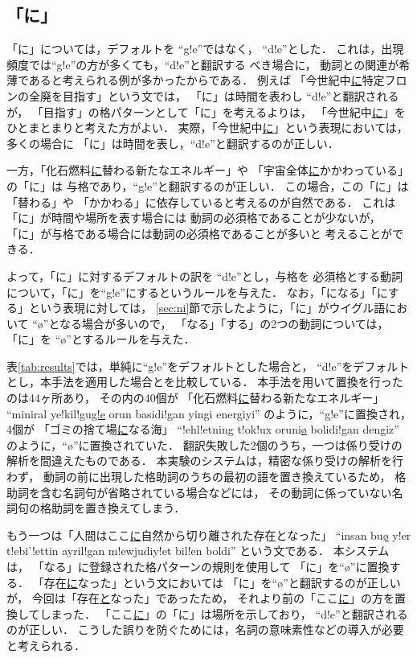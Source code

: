 \subsection{「に」}
\label{sec:ex_ni}
「に」については，デフォルトを ``g!e''ではなく，
``d!e''とした．
これは，出現頻度では``g!e''の方が多くても，``d!e''と翻訳する
べき場合に，
動詞との関連が希薄であると考えられる例が多かったからである．
例えば
「今世紀中\underline{に}特定フロンの全廃を目指す」という文では，
「に」は時間を表わし ``d!e''と翻訳されるが，
「目指す」の格パターンとして「に」を考えるよりは，
「今世紀中\underline{に}」をひとまとまりと考えた方がよい．
実際，「今世紀中\underline{に}」という表現においては，多くの場合に
「に」は時間を表し，``d!e''と翻訳するのが正しい．

一方，「化石燃料\underline{に}替わる新たなエネルギー」や
「宇宙全体\underline{に}かかわっている」の「に」は
与格であり，``g!e''と翻訳するのが正しい．
この場合，この「に」は「替わる」や
「かかわる」に依存していると考えるのが自然である．
これは「に」が時間や場所を表す場合には
動詞の必須格であることが少ないが，
「に」が与格である場合には動詞の必須格であることが多いと
考えることができる．

よって，「に」に対するデフォルトの訳を ``d!e''とし，与格を
必須格とする動詞について，「に」を``g!e''にするというルールを与えた．
なお，「になる」「にする」という表現に対しては，
\ref{sec:ni}節で示したように，「に」がウイグル語において
``\o''となる場合が多いので，
「なる」「する」の2つの動詞については，
「に」を ``\o''とするルールを与えた．

表\ref{tab:results}では，単純に``g!e''をデフォルトとした場合と，
``d!e''をデフォルトとし，本手法を適用した場合とを比較している．
本手法を用いて置換を行ったのは44ヶ所あり，
その内の40個が
「化石燃料\underline{に}替わる新たなエネルギー」 ``miniral
ye!kil!gu\underline{g!e} orun basidi!gan yingi energiyi''
のように，``g!e''に置換され，
4個が 
「ゴミの捨て場\underline{に}なる海」 ``!ehl!etning t!ok!ux oruni\underline{\o}
 bolidi!gan dengiz''
のように，``\o''に置換されていた．
翻訳失敗した2個のうち，一つは係り受けの解析を間違えたものである．
本実験のシステムは，精密な係り受けの解析を行わず，
動詞の前に出現した格助詞のうちの最初の語を置き換えているため，
格助詞を含む名詞句が省略されている場合などには，
その動詞に係っていない名詞句の格助詞を置き換えてしまう．

もう一つは「人間はここ\underline{に}自然から切り離された存在となった」
``insan bu\underline{\o} y!er t!ebi'!ettin ayril!gan m!ewjudiy!et bil!en boldi''
という文である．
本システムは，
「なる」に登録された格パターンの規則を使用して
「に」を``\o''に置換する．
「存在\underline{に}なった」という文においては
「に」を``\o''と翻訳するのが正しいが，
今回は「存在\underline{と}なった」であったため，
それより前の「ここ\underline{に}」の方を置換してしまった．
「ここ\underline{に}」の「に」は場所を示しており，
``d!e''と翻訳されるのが正しい．
こうした誤りを防ぐためには，名詞の意味素性などの導入が必要と考えられる．

